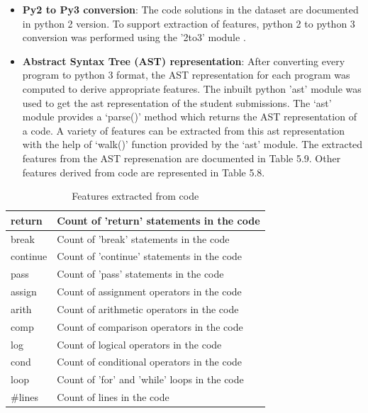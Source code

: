 \begin{itemize}
        \item \textbf{Py2 to Py3 conversion}: The code solutions in the dataset are documented in python 2 version. To support extraction of features, python 2 to python 3 conversion was performed using the '2to3' module \cite{G}.
        \item \textbf{Abstract Syntax Tree (AST) representation}: After converting every program to python 3 format, the AST \cite{F} representation for each program was computed to derive appropriate features. The inbuilt python 'ast' module was used to get the ast representation of the student submissions. The ‘ast’ module provides a ‘parse()’ method which returns the AST representation of a code. A variety of features can be extracted from this ast representation with the help of ‘walk()’ function provided by the ‘ast’ module. The extracted features from the AST represenation are documented in Table 5.9. Other features derived from code are represented in Table 5.8.
        
\end{itemize}

\begin{table}[h]
\centering
\begin{tabular}{|l|l|} 
\hline
return       & Count of 'return' statements in the code      \\ 
\hline
break        & Count of 'break' statements in the code       \\ 
\hline
continue     & Count of 'continue' statements in the code    \\ 
\hline
pass         & Count of 'pass' statements in the code        \\ 
\hline
assign       & Count of assignment operators in the code     \\ 
\hline
arith        & Count of arithmetic operators in the code     \\ 
\hline
comp         & Count of comparison operators in the code     \\ 
\hline
log          & Count of logical operators in the code        \\ 
\hline
cond         & Count of conditional operators in the code    \\ 
\hline
loop         & Count of 'for' and 'while' loops in the code  \\ 
\hline
\#lines      & Count of lines in the code                    \\ 
\hline
\end{tabular}



\caption{Features extracted from code}
\end{table}







